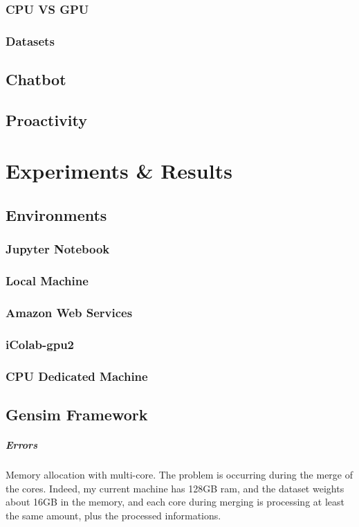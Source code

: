 \subsection{CPU VS GPU}
\subsection{Datasets}
\section{Chatbot}
\section{Proactivity}



\chapter{Experiments \& Results}
\label{chap:experiments-results}
\section{Environments}
\subsection{Jupyter Notebook}
\subsection{Local Machine}
\subsection{Amazon Web Services}
\subsection{iColab-gpu2}
\subsection{CPU Dedicated Machine}


\section{Gensim Framework}
\paragraph{Errors} Memory allocation with multi-core. The problem is occurring during the merge of the cores. Indeed, my current machine has 128GB ram, and the dataset weights about 16GB in the memory, and each core during merging is processing at least the same amount, plus the processed informations.\\ 

